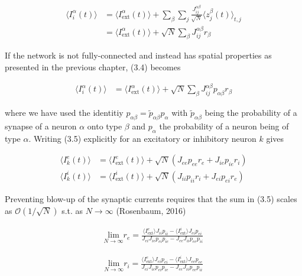 \documentclass{ucetd}
\begin{document}
\begin{align}
\langle I_{i}^{\alpha}(t)\rangle &= \langle I_{\mathrm{ext}}^{\alpha}(t)\rangle + \sum_{\beta}\sum_{j} \frac{J_{ij}^{\alpha\beta}}{\sqrt{N}}\langle z_{j}^{\beta}(t)\rangle_{t,j}\\
&= \langle I_{\mathrm{ext}}^{\alpha}(t)\rangle + \sqrt{N}\sum_{\beta}J_{ij}^{\alpha\beta} r_{\beta}
\end{align}

If the network is not fully-connected and instead has spatial properties as presented in the previous chapter, (3.4) becomes

\begin{align}
\langle I_{i}^{\alpha}(t)\rangle &= \langle I_{\mathrm{ext}}^{\alpha}(t)\rangle + \sqrt{N}\sum_{\beta}J_{ij}^{\alpha\beta}p_{\alpha\beta}r_{\beta}
\end{align}

where we have used the identitiy $p_{\alpha\beta} = \tilde{p}_{\alpha\beta}p_{\alpha}$ with $\tilde{p}_{\alpha\beta}$ being the probability of a synapse of a neuron $\alpha$ onto type $\beta$ and $p_{\alpha}$ the probability of a neuron being of type $\alpha$. Writing (3.5) explicitly for an excitatory or inhibitory neuron $k$ gives

\begin{align}
\langle I_{k}^{e}(t)\rangle &= \langle I_{\mathrm{ext}}^{e}(t)\rangle + \sqrt{N}\left(J_{ee}p_{ee}r_{e} + J_{ie}p_{ie}r_{i}\right)\\
\langle I_{k}^{i}(t)\rangle &= \langle I_{\mathrm{ext}}^{i}(t)\rangle + \sqrt{N}\left(J_{ii}p_{ii}r_{i} + J_{ei}p_{ei}r_{e}\right)
\end{align}


Preventing blow-up of the synaptic currents requires that the sum in (3.5) scales as $\mathcal{O}\left(1/\sqrt{N}\right)$ s.t. as $N\rightarrow \infty$ (Rosenbaum, 2016)

\begin{align}
\underset{N\rightarrow \infty}{\mathrm{lim}}r_{e} = \frac{\langle I_{\mathrm{ext}}^{e}\rangle J_{ii}p_{ii} - \langle I_{\mathrm{ext}}^{i}\rangle J_{ei}p_{ei}}{J_{ei}J_{ie}p_{ei}p_{ie} - J_{ee}J_{ii}p_{ee}p_{ii}}
\end{align}

\begin{align}
\underset{N\rightarrow \infty}{\mathrm{lim}}r_{i} = \frac{\langle I_{\mathrm{ext}}^{e}\rangle J_{ei}p_{ei} - \langle I_{\mathrm{ext}}^{i}\rangle J_{ee}p_{ee}}{J_{ei}J_{ie}p_{ei}p_{ie} - J_{ee}J_{ii}p_{ee}p_{ii}}
\end{align}
\end{document}
